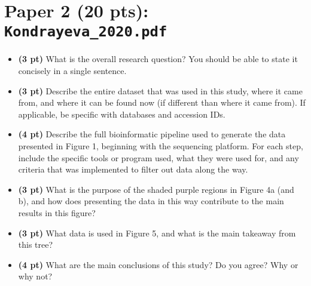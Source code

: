 \documentclass{article}
\begin{document}
\section*{Paper 2 (20 pts): \texttt{Kondrayeva\_2020.pdf}}
\begin{itemize}
    \item \textbf{(3 pt)} What is the overall research question? You should be able to state it concisely in a single sentence.
    \item \textbf{(3 pt)} Describe the entire dataset that was used in this study, where it came from, and where it can be found now (if different than where it came from). If applicable, be specific with databases and accession IDs.
    \item \textbf{(4 pt)} Describe the full bioinformatic pipeline used to generate the data presented in Figure 1, beginning with the sequencing platform. For each step, include the specific tools or program used, what they were used for, and any criteria that was implemented to filter out data along the way.
    \item \textbf{(3 pt)} What is the purpose of the shaded purple regions in Figure 4a (and b), and how does presenting the data in this way contribute to the main results in this figure?
    \item \textbf{(3 pt)} What data is used in Figure 5, and what is the main takeaway from this tree?
    \item \textbf{(4 pt)} What are the main conclusions of this study? Do you agree? Why or why not?
\end{itemize}
\end{document}
